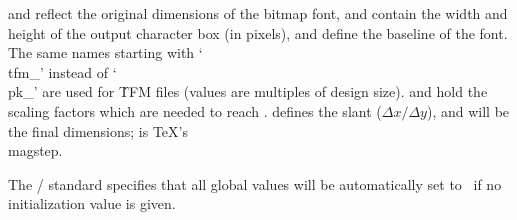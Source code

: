  and  reflect the original
dimensions of the
bitmap font,  and 
contain the width and
height of the output character box (in pixels),  and
 define the baseline of the font. The same names starting
with
`\\{tfm\_}' instead of `\\{pk\_}' are used for \.{TFM} files (values are
multiples of design size).  and  hold the scaling
factors
which are needed to reach .  defines the
slant ($\Delta
x / \Delta y$),  and  will be
the final
dimensions;  is %
\TeX's
\.{\\magstep}.

The \CEE/ standard specifies that all global values will be automatically
set to~ if no initialization value is given.

